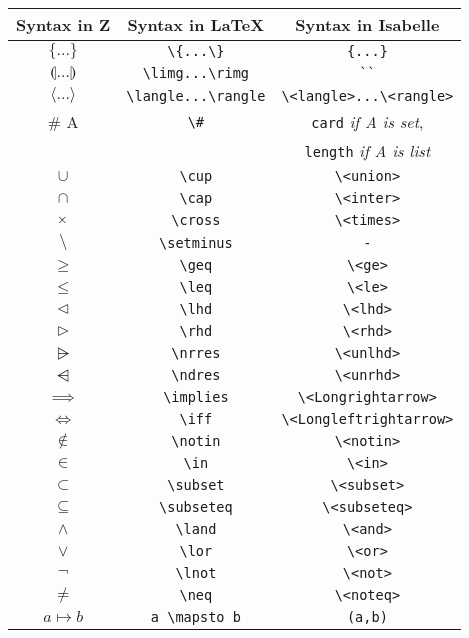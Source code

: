 {\def\arraystretch{0.5}\tabcolsep=0.5pt
\begin{longtable}[H]{|c | c | c |}
\hline
\textbf{Syntax in Z} & \textbf{Syntax in \LaTeX} & \textbf{Syntax in Isabelle}
\\
\hline
\hline
$\{...\}$ & \verb|\{...\}| & \verb|{...}|\\
\hline
$\limg...\rimg$ & \verb|\limg...\rimg| & \verb|``| \\
\hline
$\langle...\rangle$ & \verb|\langle...\rangle| & \verb|\<langle>...\<rangle>| \\
\hline
$\# $ A & \verb|\#| & \verb|card| \textit{if A is set}, \\
& & \verb|length| \textit{if A is list} \\
\hline
$\cup $ & \verb|\cup| & \verb|\<union>| \\
\hline
$\cap$ & \verb|\cap| & \verb|\<inter>| \\
\hline
$\times$ & \verb|\cross| & \verb|\<times>| \\
\hline
$\setminus$ & \verb|\setminus| & \verb|-| \\
\hline
$\geq$ & \verb|\geq| & \verb|\<ge>| \\
\hline
$\leq$ & \verb|\leq| & \verb|\<le>| \\
\hline
$\lhd$ & \verb|\lhd| & \verb|\<lhd>| \\
\hline
$\rhd$ & \verb|\rhd| & \verb|\<rhd>| \\
\hline
$\nrres$ & \verb|\nrres| & \verb|\<unlhd>| \\
\hline
$\ndres$ & \verb|\ndres| & \verb|\<unrhd>| \\
\hline
$\implies$ & \verb|\implies| & \verb|\<Longrightarrow>| \\
\hline
$\iff$ & \verb|\iff| & \verb|\<Longleftrightarrow>| \\
\hline
$\notin$ & \verb|\notin| & \verb|\<notin>| \\
\hline
$\in$ & \verb|\in| & \verb|\<in>| \\
\hline
$\subset$ & \verb|\subset| & \verb|\<subset>| \\
\hline
$\subseteq$ & \verb|\subseteq| & \verb|\<subseteq>| \\
\hline
$\land$ & \verb|\land| & \verb|\<and>| \\
\hline
$\lor$ & \verb|\lor| & \verb|\<or>| \\
\hline
$\lnot$ & \verb|\lnot| & \verb|\<not>| \\
\hline
$\neq$ & \verb|\neq| & \verb|\<noteq>| \\
\hline
$a \mapsto b$ & \verb|a \mapsto b| & \verb|(a,b)| \\

\end{longtable}}
